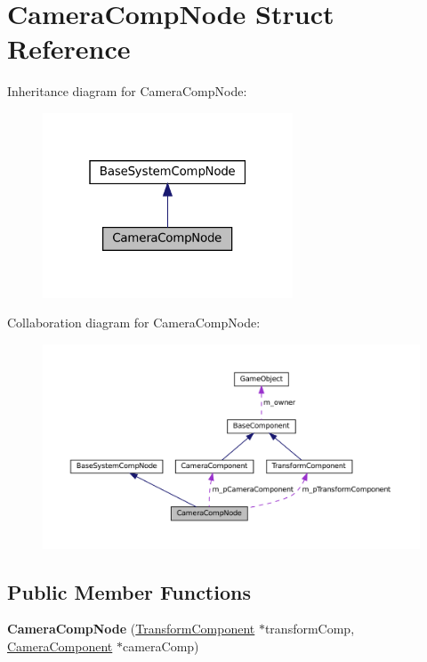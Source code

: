 \hypertarget{structCameraCompNode}{}\section{Camera\+Comp\+Node Struct Reference}
\label{structCameraCompNode}


Inheritance diagram for Camera\+Comp\+Node\+:\nopagebreak
\begin{figure}[H]
\begin{center}
\leavevmode
\includegraphics[width=211pt]{structCameraCompNode__inherit__graph}
\end{center}
\end{figure}


Collaboration diagram for Camera\+Comp\+Node\+:\nopagebreak
\begin{figure}[H]
\begin{center}
\leavevmode
\includegraphics[width=350pt]{structCameraCompNode__coll__graph}
\end{center}
\end{figure}
\subsection*{Public Member Functions}
\begin{DoxyCompactItemize}
\item 
\mbox{\label{structCameraCompNode_ad212f0250cd99dd43b73d9553c26cfda}} 
{\bfseries Camera\+Comp\+Node} (\hyperlink{classTransformComponent}{Transform\+Component} $\ast$transform\+Comp, \hyperlink{classCameraComponent}{Camera\+Component} $\ast$camera\+Comp)
\end{DoxyCompactItemize}
